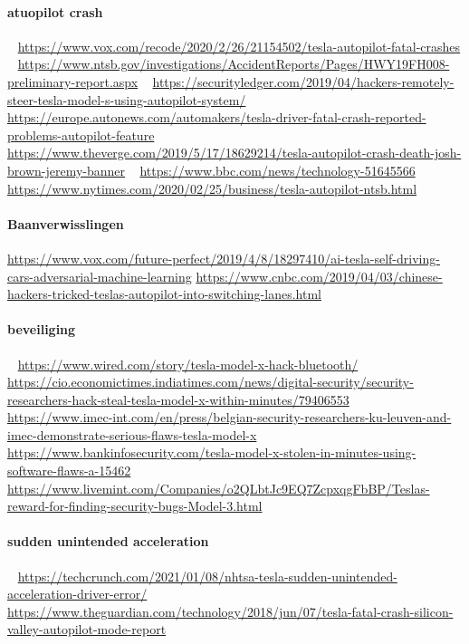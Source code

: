 \documentclass{article}
\begin{document}
\paragraph{atuopilot crash}
~\cite{taslafatal}
\url{https://www.vox.com/recode/2020/2/26/21154502/tesla-autopilot-fatal-crashes}
~\cite{ntsbprelimreport}
\url{https://www.ntsb.gov/investigations/AccidentReports/Pages/HWY19FH008-preliminary-report.aspx}
~\cite{hackerautopilot}
\url{https://securityledger.com/2019/04/hackers-remotely-steer-tesla-model-s-using-autopilot-system/}
~\cite{autonewsfeature}
\url{https://europe.autonews.com/automakers/tesla-driver-fatal-crash-reported-problems-autopilot-feature}
~\cite{thevergedeathtesla}
\url{https://www.theverge.com/2019/5/17/18629214/tesla-autopilot-crash-death-josh-brown-jeremy-banner}
~\cite{bbctech}
\url{https://www.bbc.com/news/technology-51645566}
~\cite{nytimestesla}
\url{https://www.nytimes.com/2020/02/25/business/tesla-autopilot-ntsb.html}




\paragraph{Baanverwisslingen}
\url{https://www.vox.com/future-perfect/2019/4/8/18297410/ai-tesla-self-driving-cars-adversarial-machine-learning}
\url{https://www.cnbc.com/2019/04/03/chinese-hackers-tricked-teslas-autopilot-into-switching-lanes.html}


\paragraph{beveiliging}
~\cite{teslabluetooth}
\url{https://www.wired.com/story/tesla-model-x-hack-bluetooth/}
~\cite{teslahackinminutes}
\url{https://cio.economictimes.indiatimes.com/news/digital-security/security-researchers-hack-steal-tesla-model-x-within-minutes/79406553}
~\cite{belghacktesla}
\url{https://www.imec-int.com/en/press/belgian-security-researchers-ku-leuven-and-imec-demonstrate-serious-flaws-tesla-model-x}
~\cite{backteslaflaw}
\url{https://www.bankinfosecurity.com/tesla-model-x-stolen-in-minutes-using-software-flaws-a-15462}
~\cite{teslabugreward}
\url{https://www.livemint.com/Companies/o2QLbtJc9EQ7ZcpxqgFbBP/Teslas-reward-for-finding-security-bugs-Model-3.html}
\paragraph{sudden unintended acceleration}
~\cite{unintendedacctesla}
\url{https://techcrunch.com/2021/01/08/nhtsa-tesla-sudden-unintended-acceleration-driver-error/}
~\cite{teslasilval}
\url{https://www.theguardian.com/technology/2018/jun/07/tesla-fatal-crash-silicon-valley-autopilot-mode-report}
\end{document}
